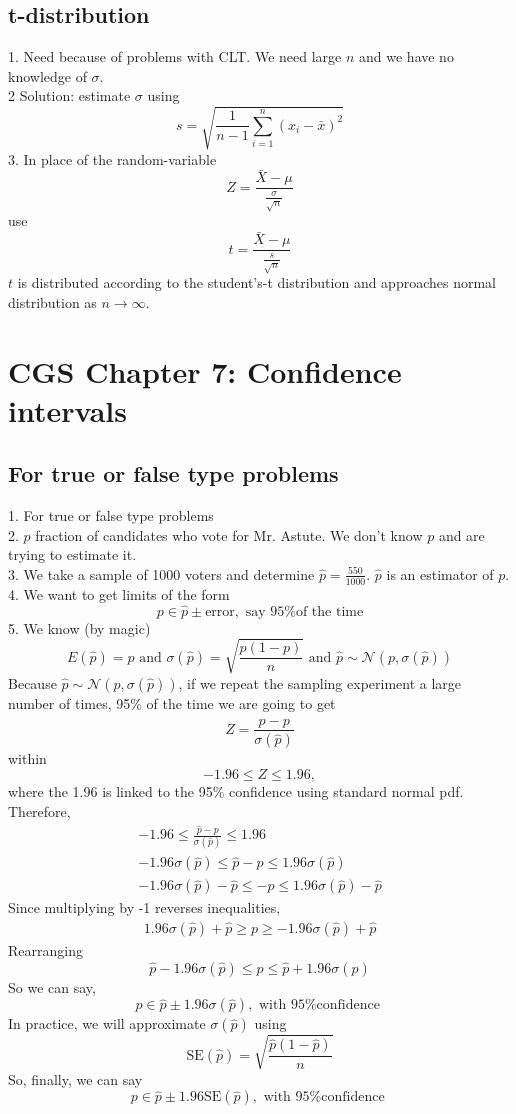 \documentclass{article}
\newcommand{\beq}{\begin{equation}}
\newcommand{\eeq}{\end{equation}}
\newcommand{\ber}{\begin{eqnarray}}
\newcommand{\eer}{\end{eqnarray}}
\begin{document}
\subsection{t-distribution}
1. Need because of problems with CLT. We need large $n$ and we have no knowledge of $\sigma$.\\
2  Solution: estimate $\sigma$ using
\beq
s = \sqrt{\frac{1}{n-1}\sum_{i=1}^{n}(x_i-\bar{x})^2}
\eeq
3. In place of the random-variable
\beq
Z = \frac{\bar{X}-\mu}{\frac{\sigma}{\sqrt{n}}}
\eeq
use
\beq
t=\frac{\bar{X}-\mu}{\frac{s}{\sqrt{n}}}
\eeq
$t$ is distributed according to the student's-t distribution and approaches normal distribution as $n\rightarrow\infty$.
\section{CGS Chapter 7: Confidence intervals}
\subsection{For true or false type problems}
1. For true or false type problems\\
2. $p$ fraction of candidates who vote for Mr. Astute. We don't know $p$ and are trying to estimate it.\\
3. We take a sample of 1000 voters and determine $\hat{p}=\frac{550}{1000}$. $\hat{p}$ is an estimator of $p$.
4. We want to get limits  of the form
\beq
p \in \hat{p} \pm \text{error} , \text{ say 95\% of the time}
\eeq
5. We know (by magic)
\beq
E(\hat{p}) = p \text{ and } \sigma(\hat{p}) = \sqrt{\frac{p(1-p)}{n}} \text{ and } \hat{p} \sim \mathcal{N}(p,\sigma(\hat{p}))
\eeq
Because $\hat{p} \sim \mathcal{N}(p,\sigma(\hat{p}))$, if we repeat the sampling experiment a large number of times, 95\% of the time we are going to get 
\beq
Z = \frac{\hat{p}-p}{\sigma(\hat{p})}
\eeq
within
\beq
-1.96 \le Z \le 1.96,
\eeq
where the 1.96 is linked to the 95\% confidence using standard normal pdf. Therefore,
\ber
-1.96 \le \frac{\hat{p}-p}{\sigma(\hat{p})} \le 1.96 \\
-1.96\sigma(\hat{p}) \le \hat{p}-p \le 1.96\sigma(\hat{p}) \\
-1.96\sigma(\hat{p}) - \hat{p}\le -p \le 1.96\sigma(\hat{p}) - \hat{p}
\eer
Since multiplying by -1 reverses inequalities,
\ber
1.96\sigma(\hat{p}) + \hat{p} \ge p \ge -1.96\sigma(\hat{p}) + \hat{p} 
\eer
Rearranging
\beq
\hat{p} -1.96\sigma(\hat{p}) \le p \le \hat{p} + 1.96\sigma(\hat{p})
\eeq
So we can say,
\beq
p \in \hat{p} \pm 1.96\sigma(\hat{p}), \text{ with 95\% confidence }
\eeq
In practice, we will approximate $\sigma(\hat{p})$ using
\beq
\text{SE}(\hat{p}) = \sqrt{\frac{\hat{p}(1-\hat{p})}{n}}
\eeq
So, finally, we can say
\beq
p \in \hat{p} \pm 1.96\text{SE}(\hat{p}), \text{ with 95\% confidence }
\eeq
\end{document}
